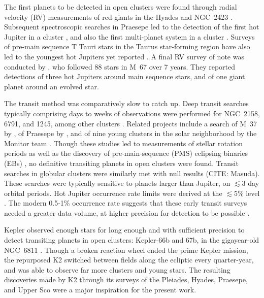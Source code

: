 \documentclass[12pt,twocolumn,tighten]{aastex62}
\begin{document}
The first planets to be detected in open clusters were found through
radial velocity (RV) measurements of red giants in the Hyades and
NGC~2423 \citep{Sato_et_al_2007,lovis_mayor_2007}.  Subsequent
spectroscopic searches in Praesepe led to the detection of the first
hot Jupiter in a cluster \citep{Quinn_et_al_2012}, and also the first
multi-planet system in a cluster \citep{Malavolta_et_al_2016}.
Surveys of pre-main sequence T Tauri stars in the Taurus star-forming
region have also led to the youngest hot Jupiters yet reported
\citep[V830~Tau~b and
CI~Tau~b][]{donati_hj_2016,johns-krull_candidate_2016,flagg_co_2019}.
A final RV survey of note was conducted by
\citet{brucalassi_search_2017}, who followed 88 stars in M~67 over 7
years.  They reported detections of three hot Jupiters around main
sequence stars, and of one giant planet around an evolved star.

The transit method was comparatively slow to catch up.  Deep transit
searches typically comprising days to weeks of observations were
performed for NGC~2158, 6791, and 1245, among other clusters
\citep{mochejska_planets_2005,mochejska_planets_2006,burke_survey_2006}.
Related projects include a search of M~37 by
\citet{hartman_MMT_IV_2009}, of Praesepe by
\citet{pepper_photometric_2008}, and of nine young clusters in the
solar neighborhood by the Monitor team
\citep{aigrain_monitor_2007,irwin_monitordata_2007,miller_monitor_2008}.
Though these studies led to measurements of stellar rotation periods
\citep{hartman_rotation_2009,Irwin_NGC2516_2007} as well as the
discovery of pre-main-sequence (PMS) eclipsing binaries (EBs)
\citep{irwin_monitor_PMSEB_2007}, no definitive transiting planets in
open clusters were found.  Transit searches in globular clusters were
similarly met with null results \citep{gilliland_lack_2000,
weldrake_searching_2006} (CITE: Masuda).  These searches were
typically sensitive to planets larger than Jupiter, on $\lesssim 3$
day orbital periods.  Hot Jupiter occurrence rate limits were derived
at the $\lesssim 5\%$ level \citep[{\it e.g.},][]{burke_survey_2006,
hartman_MMT_IV_2009}.  The modern 0.5-1\% occurrence rate suggests
that these early transit surveys needed a greater data volume, at
higher precision for detection to be possible
\citep{mayor_harps_2011,wright_frequency_2012,howard_planet_2012,petigura_metallicity_2018}.

Kepler \citep{borucki_kepler_2010} observed enough stars for long
enough and with sufficient precision to detect transiting planets in
open clusters:  Kepler-66b and 67b, in the gigayear-old NGC~6811
\citep{Meibom_et_al_2013}.  Though a broken reaction wheel ended the
prime Kepler mission, the repurposed K2 \citep{howell_k2_2014}
switched between fields along the ecliptic every quarter-year, and was
able to observe far more clusters and young stars.  The resulting
discoveries made by K2 through its surveys of the Pleiades, Hyades,
Praesepe, and Upper Sco were a major inspiration for the present work.
\end{document}
